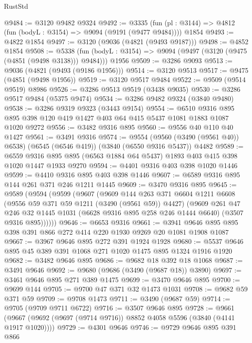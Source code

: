 \begin{lexlean}{RustStd}
\begin{coremodule}
{\begin{coremodule}
{{{{{{{{{{{{{{{{{{{{{{{{{{@9484 := @3120 @9482 @9324
@9492 := @3335
    (fun (pl : @3144) => @4812 (fun (bodyL : @3154) => @9094 (@9191 (@9477 @9484))))
    @1854
@9493 := @4822 @1854
@9497 := @3120 (@9036 (@4821 (@9493 @9187)))
@9498 := @4852 @1854
@9508 := @5338
    (fun (bodyL : @3154) => @9094 (@9497 (@3120 (@9475 (@4851 (@9498 @3138))) @9484)))
    @1956
@9509 := @3286 @9093
@9513 := @9036 (@4821 (@9493 (@9186 @1956)))
@9514 := @3120 @9513
@9517 := @9475 (@4851 (@9498 @1956))
@9519 := @3120 @9517 @9484
@9522 := @9509 (@9514 @9519) @8986
@9526 := @3286 @9513 @9519 (@3438 @9035)
@9530 := @3286 @9517 @9484 (@5375 @9474)
@9534 := @3286 @9482 @9324 (@3840 @9480)
@9538 := @3286 @9319 @9323 (@3443 @9154)
@9554 := @6510
    @9316
    @895
    @895
    @398
    @120
    @419
    @1427
    @403
    @64
    @415
    @5437
    @1081
    @1883
    @1087
    @1020
    @9272
@9556 := @3482 @9316 @895
@9560 := @9556 @40 @110 @40 @1427
@9561 := @3491 @9316
@9574 := @9554
    (@9560 (@3490 (@9561 @40)) @6538)
    (@6545 (@6546 @419))
    (@3840 (@6550 @9316 @5437))
    @4482
@9589 := @6559 @9316 @895 @895 (@6563 @1884 @64 @5437) @1893 @403 @415 @398 @1020 @1447 @1933 @9270
@9594 := @4401 @9316 @403 @398 @1020 @1446
@9599 := @4410 @9316 @895 @403 @398 @1446
@9607 := @6589 @9316 @895 @144 @261 @371 @246 @1211 @1445
@9609 := @3470 @9316 @895
@9645 := @9589
    (@9594
      (@9599
        (@9607
          (@9609
            @144
            @263
            @371
            @6604
            @1211
            @6608
            (@9556 @59 @371 @59 @1211 (@3490 (@9561 @59)) @4427)
            (@9609
              @261
              @47
              @246
              @32
              @1445
              @1031
              (@6628 @9316 @895 @258 @246 @1444 @6640)
              (@3507 @9316 @895))))))
@9646 := @6653 @9316
@9661 := @3941 @9646 @895 @895 @398 @391 @866 @272 @414 @220 @1930 @9269 @20 @1081 @1908 @1087
@9667 := @3967 @9646 @895 @272 @391 @1924 @1928
@9680 := @5537 @9646 @895 @45 @389 @391 @1068 @271 @1020 @1475 @895 @1324 @1916 @1920
@9682 := @3482 @9646 @895
@9686 := @9682 @18 @392 @18 @1068
@9687 := @3491 @9646
@9692 := @9680 (@9686 (@3490 (@9687 @18)) @3890)
@9697 := @3461 @9646 @895 @271 @389 @1475
@9699 := @3470 @9646 @895
@9700 := @9699 @144
@9705 := @9700 @47 @371 @32 @1473 @1031
@9708 := @9682 @59 @371 @59
@9709 := @9708 @1473
@9711 := @3490 (@9687 @59)
@9714 := @9705 (@9709 @9711 @6722)
@9716 := @3507 @9646 @895
@9728 := @9661 (@9667 (@9692 (@9697 (@9714 @9716)) @8852 @4058 @5596 (@3840 (@4141 @1917 @1020))))
@9729 := @4301 @9646
@9746 := @9729
    @9646
    @895
    @391
    @866
}}}}}}}}}}}}}}}}}}}}}}}}}}
\end{coremodule}}
\end{coremodule}
\end{lexlean}
